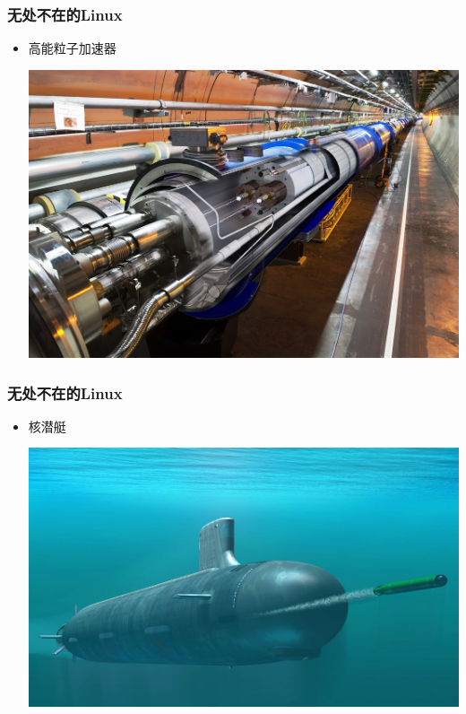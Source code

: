 \documentclass[xcolor=svgnames,bigger,presentation]{beamer}
\begin{document}
\begin{frame}
\frametitle{无处不在的Linux}
\label{sec-2-4-9}
\begin{itemize}

\item 高能粒子加速器
\label{sec-2-4-9-1}%
\begin{center}
\includegraphics[width=.9\linewidth]{img/jiasuqi.jpg}
\end{center}

\end{itemize} %
\end{frame}
\begin{frame}
\frametitle{无处不在的Linux}
\label{sec-2-4-10}
\begin{itemize}

\item 核潜艇
\label{sec-2-4-10-1}%
\begin{center}
\includegraphics[width=.9\linewidth]{img/nuclear.jpg}
\end{center}

\end{itemize} %
\end{frame}
\end{document}
